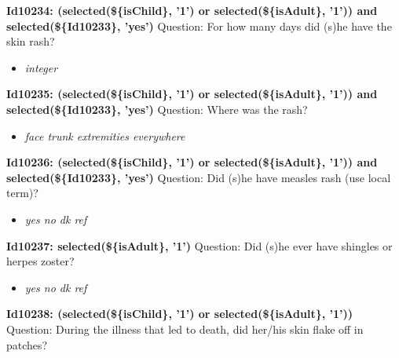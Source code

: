 \documentclass{article}%
\begin{document}
\textbf{Id10234: (selected(\$\{isChild\}, '1') or selected(\$\{isAdult\}, '1')) and selected(\$\{Id10233\}, 'yes')\newline%
}%
Question: For how many days did (s)he have the skin rash?\newline%
%
\begin{itemize}%
\item%
\textit{integer\newline%
}%
\end{itemize}%
\textbf{Id10235: (selected(\$\{isChild\}, '1') or selected(\$\{isAdult\}, '1')) and selected(\$\{Id10233\}, 'yes')\newline%
}%
Question: Where was the rash?\newline%
%
\begin{itemize}%
\item%
\textit{face\newline%
 trunk\newline%
 extremities\newline%
 everywhere\newline%
}%
\end{itemize}%
\textbf{Id10236: (selected(\$\{isChild\}, '1') or selected(\$\{isAdult\}, '1')) and selected(\$\{Id10233\}, 'yes')\newline%
}%
Question: Did (s)he have measles rash (use local term)?\newline%
%
\begin{itemize}%
\item%
\textit{yes\newline%
 no\newline%
 dk\newline%
 ref\newline%
}%
\end{itemize}%
\textbf{Id10237: selected(\$\{isAdult\}, '1') \newline%
}%
Question: Did (s)he ever have shingles or herpes zoster?\newline%
%
\begin{itemize}%
\item%
\textit{yes\newline%
 no\newline%
 dk\newline%
 ref\newline%
}%
\end{itemize}%
\textbf{Id10238: (selected(\$\{isChild\}, '1') or selected(\$\{isAdult\}, '1'))\newline%
}%
Question: During the illness that led to death, did her/his skin flake off in patches?\newline%
\end{document}

